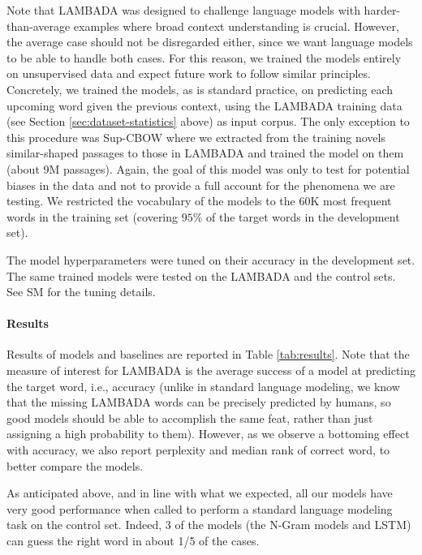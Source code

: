 Note that LAMBADA was designed to challenge language models with harder-than-average examples where broad context understanding is crucial. However, the average case should not be disregarded either, since we want language models to be able to handle both cases. For this reason, we trained the models entirely on unsupervised data and expect future work to follow similar principles. Concretely, we trained the models, as is standard practice, on predicting each upcoming word given the previous context, using the LAMBADA training data (see Section \ref{sec:dataset-statistics} above) as input corpus.  The only exception to this procedure was Sup-CBOW where we extracted from the training novels similar-shaped passages to those in LAMBADA and trained the model on them (about 9M passages). Again, the goal of this model was only to test for potential biases in the data and not to provide a full account for the phenomena we are testing.  We restricted the vocabulary of the models to the 60K most frequent words in the training set (covering $95\%$ of the target words in the development set). 

The model hyperparameters were tuned on their accuracy in the development set. The same trained models were tested on the LAMBADA and the control sets. See SM for the tuning details. 

\newcommand{\expnumber}[2]{{#1}\mathrm{e}{#2}}

\paragraph{Results} Results of models and baselines are reported in Table \ref{tab:results}. Note that the measure of interest for LAMBADA is the average success of a model at predicting the target word, i.e., accuracy (unlike in standard language modeling, we know that the missing LAMBADA words can be precisely predicted by humans, so good models should be able to accomplish the same feat, rather than just assigning a high probability to them). However, as we observe a bottoming effect with accuracy, we also report perplexity and median rank of correct word, to better compare the models.

As anticipated above, and in line with what we expected, all our models have very good performance when called to perform a standard language modeling task on the control set. Indeed, 3 of the models (the N-Gram models and LSTM) can guess the right word in about 1/5 of the cases.

